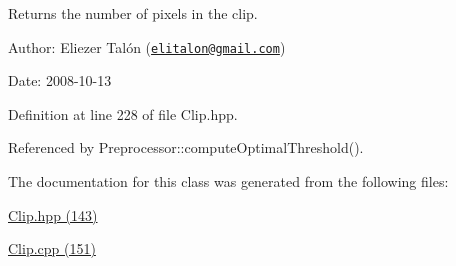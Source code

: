 Returns the number of pixels in the clip. 

\begin{Desc}
\item[Author:]Eliezer Talón (\href{mailto:elitalon@gmail.com}{\tt elitalon@gmail.com}) \end{Desc}
\begin{Desc}
\item[Date:]2008-10-13 \end{Desc}


Definition at line 228 of file Clip.hpp.

Referenced by Preprocessor::computeOptimalThreshold().

The documentation for this class was generated from the following files:\begin{CompactItemize}
\item 
\hyperlink{_clip_8hpp}{Clip.hpp (143)}\item 
\hyperlink{_clip_8cpp}{Clip.cpp (151)}\end{CompactItemize}
